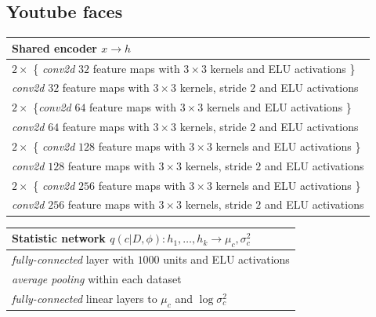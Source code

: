 \documentclass{article} %
\begin{document}
\subsection{Youtube faces}
\label{appendixb:faces}
\begin{table}[H]

    \begin{tabular}{  l}
    \bf{Shared encoder} $x \to h$ \\ \hline
    $2 \times$ \{ \emph{conv2d} $32$ feature maps with $3 \times 3$ kernels and ELU activations \} \\
    \emph{conv2d} $32$ feature maps with $3 \times 3$ kernels, stride $2$ and ELU activations \\
    
    $2 \times$ \{\emph{conv2d} $64$ feature maps with $3 \times 3$ kernels and ELU activations \} \\
    \emph{conv2d} $64$ feature maps with $3 \times 3$ kernels, stride $2$ and ELU activations  \\
    
    $2 \times$ \{ \emph{conv2d} $128$ feature maps with $3 \times 3$ kernels and ELU activations \} \\
    \emph{conv2d} $128$ feature maps with $3 \times 3$ kernels, stride $2$ and ELU activations \\
    
    $2 \times$ \{ \emph{conv2d} $256$ feature maps with $3 \times 3$ kernels and ELU activations \} \\
    \emph{conv2d} $256$ feature maps with $3 \times 3$ kernels, stride $2$ and ELU activations
    \label{table:faces_common_encoder}
    \end{tabular}
\end{table}
\begin{table}[H]

    \begin{tabular}{  l}
    \bf{Statistic network} $q(c | D, \phi): h_1, \dots, h_k \to \mu_c, \sigma^2_c$ \\ \hline
    \emph{fully-connected} layer with $1000$ units and ELU activations \\
    \emph{average pooling} within each dataset\\
    \emph{fully-connected} linear layers to $\mu_c$ and $\log \sigma^2_c$
    \label{table:faces_statistic_network}
    \end{tabular}
\end{table}
\end{document}
